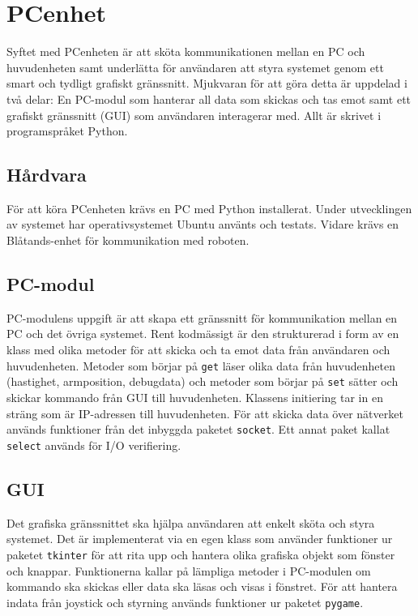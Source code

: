 
\section{PCenhet}
Syftet med PCenheten är att sköta kommunikationen mellan en PC och huvudenheten samt
underlätta för användaren att styra systemet genom ett smart och tydligt grafiskt gränssnitt.
Mjukvaran för att göra detta är uppdelad i två delar: En PC-modul som hanterar all data som
skickas och tas emot samt ett grafiskt gränssnitt (GUI) som användaren interagerar med. Allt är skrivet i
programspråket Python.

\subsection{Hårdvara}
För att köra PCenheten krävs en PC med Python installerat. Under utvecklingen av systemet har operativsystemet Ubuntu använts och testats. Vidare krävs en Blåtands-enhet för kommunikation med roboten.

\subsection{PC-modul}
PC-modulens uppgift är att skapa ett gränssnitt för kommunikation mellan en PC och det övriga
systemet. Rent kodmässigt är den strukturerad i form av en klass med olika metoder för att skicka
och ta emot data från användaren och huvudenheten. Metoder som börjar på \texttt{get} läser olika data från
huvudenheten (hastighet, armposition, debugdata) och metoder som börjar på \texttt{set} sätter och skickar
kommando från GUI till huvudenheten. Klassens initiering tar in en sträng som är IP-adressen till
huvudenheten. För att skicka data över nätverket används funktioner från det inbyggda paketet
\texttt{socket}. Ett annat paket kallat \texttt{select} används för I/O verifiering.

\subsection{GUI}
Det grafiska gränssnittet ska hjälpa användaren att enkelt sköta och styra systemet.
Det är implementerat via en egen klass som använder funktioner ur paketet \texttt{tkinter} för att rita
upp och hantera olika grafiska objekt som fönster och knappar. Funktionerna kallar på lämpliga
metoder i PC-modulen om kommando ska skickas eller data ska läsas och visas i fönstret. För att
hantera indata från joystick och styrning används funktioner ur paketet \texttt{pygame}.
